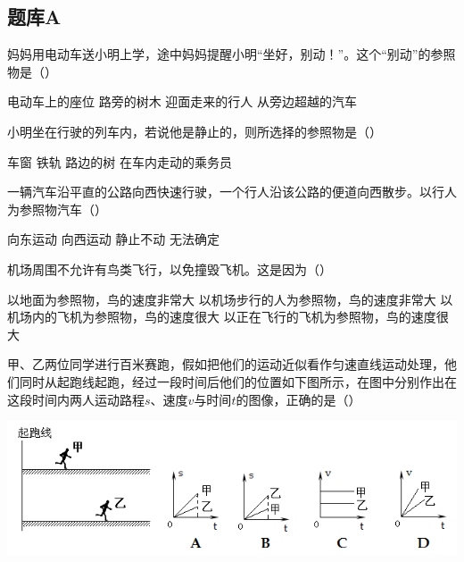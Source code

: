 \documentclass[12pt,twoside]{exam}
\begin{document}
\begin{Aquestions}
\newpage
\section{题库A}
\begin{questions}
\question
妈妈用电动车送小明上学，途中妈妈提醒小明“坐好，别动！”。这个“别动”的参照物是（\answerline*[A]）

\begin{choices}
\choice 电动车上的座位
\choice 路旁的树木
\choice 迎面走来的行人 
\choice 从旁边超越的汽车
\end{choices}


\question
小明坐在行驶的列车内，若说他是静止的，则所选择的参照物是（）\par
\begin{oneparchoices}
\choice 车窗
\choice 铁轨
\choice 路边的树
\choice 在车内走动的乘务员
\end{oneparchoices}


\question
一辆汽车沿平直的公路向西快速行驶，一个行人沿该公路的便道向西散步。以行人为参照物汽车（\answerline*[B]）

\begin{choices}
\choice 向东运动
\choice 向西运动
\choice 静止不动
\choice 无法确定
\end{choices}


\question
机场周围不允许有鸟类飞行，以免撞毁飞机。这是因为（\answerline*[D]）
\begin{choices}
\choice 以地面为参照物，鸟的速度非常大
\choice 以机场步行的人为参照物，鸟的速度非常大
\choice 以机场内的飞机为参照物，鸟的速度很大
\choice 以正在飞行的飞机为参照物，鸟的速度很大
\end{choices}


\question
甲、乙两位同学进行百米赛跑，假如把他们的运动近似看作匀速直线运动处理，他们同时从起跑线起跑，经过一段时间后他们的位置如下图所示，在图中分别作出在这段时间内两人运动路程$s$、速度$v$与时间$t$的图像，正确的是（\answerline*[B]）

\includegraphics[scale=0.8]{figures/图片7.png} 



\end{questions}
\end{Aquestions}
\end{document}
